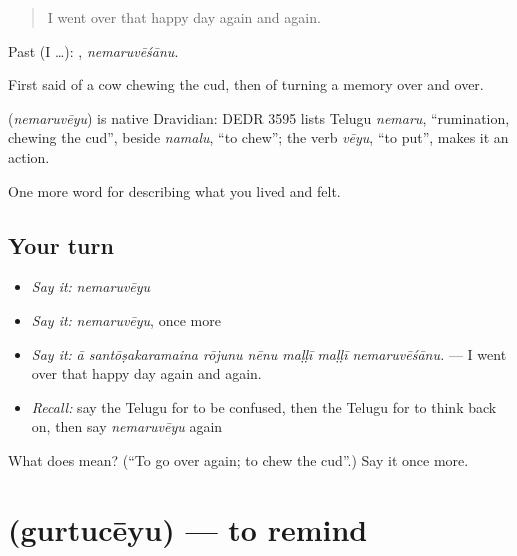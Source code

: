 \begin{quote}
I went over that happy day again and again.
\end{quote}

Past (I …): , \emph{nemaruvēśānu}.

First said of a cow chewing the cud, then of turning a memory over and over.

\begin{cousinweb}
\textbf{} (\emph{nemaruvēyu}) is native Dravidian: DEDR 3595 lists Telugu \emph{nemaru}, \textquotedblleft{}rumination, chewing the cud\textquotedblright{}, beside \emph{namalu}, \textquotedblleft{}to chew\textquotedblright{}; the verb \emph{vēyu}, \textquotedblleft{}to put\textquotedblright{}, makes it an action.
\end{cousinweb}

\begin{grammarlens}[title={What you've built}]
One more word for describing what you lived and felt.
\end{grammarlens}

\subsection*{Your turn}
\begin{itemize}
\raggedright
  \item \emph{Say it:} \emph{nemaruvēyu}
  \item \emph{Say it:} \emph{nemaruvēyu}, once more
  \item \emph{Say it:} \emph{ā santōṣakaramaina rōjunu nēnu maḷḷī maḷḷī nemaruvēśānu.} — I went over that happy day again and again.
  \item \emph{Recall:} say the Telugu for to be confused, then the Telugu for to think back on, then say \emph{nemaruvēyu} again
\end{itemize}

\begin{tcolorbox}[breakable,colback=teal!4,colframe=teal!35!black,title={Before you move on}]
What does  mean? (\textquotedblleft{}To go over again; to chew the cud\textquotedblright{}.) Say it once more.
\end{tcolorbox}
\section[\texorpdfstring{\te{గుర్తుచేయు} (gurtucēyu)}{గుర్తుచేయు (gurtucēyu)}]{ (gurtucēyu) — to remind}

